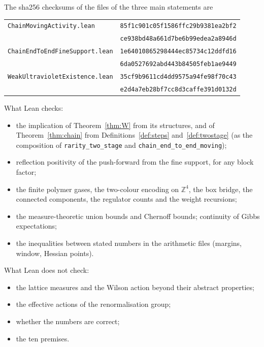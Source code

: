 \documentclass[11pt,a4paper]{article}
\theoremstyle{definition}
\theoremstyle{remark}
\newcommand{\lt}[1]{\texttt{#1}}
\begin{document}
\par\noindent\begin{minipage}{\linewidth}
The sha256 checksums of the files of the three main statements are
\begin{center}\small
\begin{tabular}{@{}ll@{}}
\texttt{ChainMovingActivity.lean} & \texttt{85f1c901c05f1586ffc29b9381ea2bf2}\\
& \texttt{ce938bd48a661d7be6b99edea2a8946d}\\
\texttt{ChainEndToEndFineSupport.lean} & \texttt{1e64010865298444ec85734c12ddfd16}\\
& \texttt{6da0527692abd443b84505feb1ae9449}\\
\texttt{WeakUltravioletExistence.lean} & \texttt{35cf9b9611cd4dd9575a94fe98f70c43}\\
& \texttt{e2d4a7eb28bf7cc8d3caffe391d0132d}\\
\end{tabular}
\end{center}
\end{minipage}

\medskip\noindent What Lean checks:
\begin{itemize}[leftmargin=2em]
\item the implication of Theorem~\ref{thm:W} from its structures, and of Theorem~\ref{thm:chain} from Definitions~\ref{def:steps} and~\ref{def:twostage} (as the composition of \lt{rarity\_\allowbreak{}two\_\allowbreak{}stage} and \lt{chain\_\allowbreak{}end\_\allowbreak{}to\_\allowbreak{}end\_\allowbreak{}moving});
\item reflection positivity of the push-forward from the fine support, for any block factor;
\item the finite polymer gases, the two-colour encoding on $\mathbb Z^4$, the box bridge, the connected components, the regulator counts and the weight recursions;
\item the measure-theoretic union bounds and Chernoff bounds; continuity of Gibbs expectations;
\item the inequalities between stated numbers in the arithmetic files (margins, window, Hessian points).
\end{itemize}
What Lean does not check:
\begin{itemize}[leftmargin=2em]
\item the lattice measures and the Wilson action beyond their abstract properties;
\item the effective actions of the renormalisation group;
\item whether the numbers are correct;
\item the ten premises.
\end{itemize}
\end{document}
